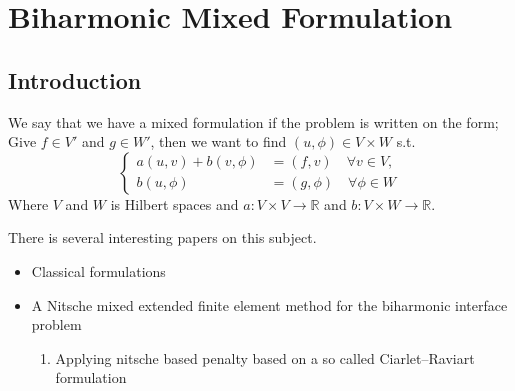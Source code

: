 
\newpage
\section{Biharmonic Mixed Formulation}%
\label{sec:biharmonic_mixed_formulation}


\subsection{Introduction}%
\label{sub:introduction}

We say that we have a mixed formulation if the problem is written on the form; Give $f \in V' $  and $g \in W' $, then we want to find $( u, \phi ) \in V \times W$  s.t. \[
    \begin{cases}
       a( u,v) + b ( v, \phi )  & = ( f,v)  \quad  \forall v \in V, \\
       b( u, \phi )  & = ( g, \phi )    \quad \forall \phi \in W
    \end{cases}
\]
Where $V$  and $W$  is Hilbert spaces and $a: V\times V \to \mathbb{R}  $ and $b: V \times W \to \mathbb{R} $.

There is several interesting papers on this subject.
\begin{itemize}
    \item Classical formulations \cite{babuvska1980analysis}
    \item  A Nitsche mixed extended finite element method for the biharmonic interface problem \cite{cai2023nitsche}
        \begin{enumerate}[label=\arabic*)]
            \item Applying nitsche based penalty based on a so called Ciarlet–Raviart formulation
        \end{enumerate}
\end{itemize}






